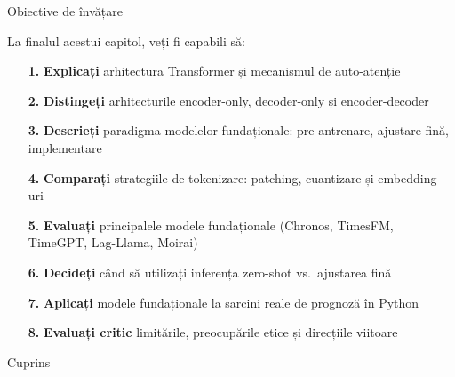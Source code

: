 \documentclass[9pt, aspectratio=169, t]{beamer}
\subtitle{Capitolul 11: LLM-uri și Modele Fundaționale pentru Serii de Timp}
\begin{document}
{
\begin{frame}
    \titlepage
\end{frame}
}

\begin{frame}{Obiective de învățare}
    \begin{cminipage}{0.95\textwidth}
    \begin{block}{La finalul acestui capitol, veți fi capabili să:}
        \begin{itemize}\setlength{\itemsep}{2pt}
            \item[\textcolor{MainBlue}{\textbf{1.}}] \textbf{Explicați} arhitectura Transformer și mecanismul de auto-atenție
            \item[\textcolor{MainBlue}{\textbf{2.}}] \textbf{Distingeți} arhitecturile encoder-only, decoder-only și encoder-decoder
            \item[\textcolor{MainBlue}{\textbf{3.}}] \textbf{Descrieți} paradigma modelelor fundaționale: pre-antrenare, ajustare fină, implementare
            \item[\textcolor{MainBlue}{\textbf{4.}}] \textbf{Comparați} strategiile de tokenizare: patching, cuantizare și embedding-uri
            \item[\textcolor{MainBlue}{\textbf{5.}}] \textbf{Evaluați} principalele modele fundaționale (Chronos, TimesFM, TimeGPT, Lag-Llama, Moirai)
            \item[\textcolor{MainBlue}{\textbf{6.}}] \textbf{Decideți} când să utilizați inferența zero-shot vs.\ ajustarea fină
            \item[\textcolor{MainBlue}{\textbf{7.}}] \textbf{Aplicați} modele fundaționale la sarcini reale de prognoză în Python
            \item[\textcolor{MainBlue}{\textbf{8.}}] \textbf{Evaluați critic} limitările, preocupările etice și direcțiile viitoare
        \end{itemize}
    \end{block}
    \end{cminipage}
\end{frame}

\begin{frame}{Cuprins}
    \vspace{-0.3cm}
    {\small
    \tableofcontents
    }
\end{frame}
\end{document}
